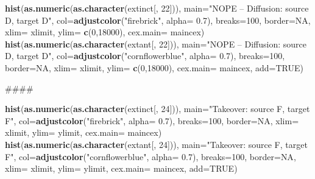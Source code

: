 \documentclass[]{book}
\newenvironment{Shaded}{\begin{snugshade}}{\end{snugshade}}
\newcommand{\KeywordTok}[1]{\textcolor[rgb]{0.13,0.29,0.53}{\textbf{{#1}}}}
\newcommand{\DataTypeTok}[1]{\textcolor[rgb]{0.13,0.29,0.53}{{#1}}}
\newcommand{\DecValTok}[1]{\textcolor[rgb]{0.00,0.00,0.81}{{#1}}}
\newcommand{\FloatTok}[1]{\textcolor[rgb]{0.00,0.00,0.81}{{#1}}}
\newcommand{\StringTok}[1]{\textcolor[rgb]{0.31,0.60,0.02}{{#1}}}
\newcommand{\OtherTok}[1]{\textcolor[rgb]{0.56,0.35,0.01}{{#1}}}
\newcommand{\NormalTok}[1]{{#1}}
\theoremstyle{definition}
\theoremstyle{definition}
\theoremstyle{remark}
\begin{document}
\begin{Shaded}
\begin{Highlighting}[]
\KeywordTok{hist}\NormalTok{(}\KeywordTok{as.numeric}\NormalTok{(}\KeywordTok{as.character}\NormalTok{(extinct[, }\DecValTok{22}\NormalTok{])), }\DataTypeTok{main=}\StringTok{"NOPE -- Diffusion: source D, target D"}\NormalTok{, }\DataTypeTok{col=}\KeywordTok{adjustcolor}\NormalTok{(}\StringTok{"firebrick"}\NormalTok{, }\DataTypeTok{alpha=} \FloatTok{0.7}\NormalTok{), }\DataTypeTok{breaks=}\DecValTok{100}\NormalTok{, }\DataTypeTok{border=}\OtherTok{NA}\NormalTok{, }\DataTypeTok{xlim=}\NormalTok{ xlimit, }\DataTypeTok{ylim=} \KeywordTok{c}\NormalTok{(}\DecValTok{0}\NormalTok{,}\DecValTok{18000}\NormalTok{), }\DataTypeTok{cex.main=}\NormalTok{ maincex)}
\KeywordTok{hist}\NormalTok{(}\KeywordTok{as.numeric}\NormalTok{(}\KeywordTok{as.character}\NormalTok{(extant[, }\DecValTok{22}\NormalTok{])), }\DataTypeTok{main=}\StringTok{"NOPE -- Diffusion: source D, target D"}\NormalTok{, }\DataTypeTok{col=}\KeywordTok{adjustcolor}\NormalTok{(}\StringTok{"cornflowerblue"}\NormalTok{, }\DataTypeTok{alpha=} \FloatTok{0.7}\NormalTok{), }\DataTypeTok{breaks=}\DecValTok{100}\NormalTok{, }\DataTypeTok{border=}\OtherTok{NA}\NormalTok{, }\DataTypeTok{xlim=}\NormalTok{ xlimit, }\DataTypeTok{ylim=} \KeywordTok{c}\NormalTok{(}\DecValTok{0}\NormalTok{,}\DecValTok{18000}\NormalTok{), }\DataTypeTok{cex.main=}\NormalTok{ maincex, }\DataTypeTok{add=}\OtherTok{TRUE}\NormalTok{)}

\NormalTok{####}

\KeywordTok{hist}\NormalTok{(}\KeywordTok{as.numeric}\NormalTok{(}\KeywordTok{as.character}\NormalTok{(extinct[, }\DecValTok{24}\NormalTok{])), }\DataTypeTok{main=}\StringTok{"Takeover: source F, target F"}\NormalTok{, }\DataTypeTok{col=}\KeywordTok{adjustcolor}\NormalTok{(}\StringTok{"firebrick"}\NormalTok{, }\DataTypeTok{alpha=} \FloatTok{0.7}\NormalTok{), }\DataTypeTok{breaks=}\DecValTok{100}\NormalTok{, }\DataTypeTok{border=}\OtherTok{NA}\NormalTok{, }\DataTypeTok{xlim=}\NormalTok{ xlimit, }\DataTypeTok{ylim=}\NormalTok{ ylimit, }\DataTypeTok{cex.main=}\NormalTok{ maincex)}
\KeywordTok{hist}\NormalTok{(}\KeywordTok{as.numeric}\NormalTok{(}\KeywordTok{as.character}\NormalTok{(extant[, }\DecValTok{24}\NormalTok{])), }\DataTypeTok{main=}\StringTok{"Takeover: source F, target F"}\NormalTok{, }\DataTypeTok{col=}\KeywordTok{adjustcolor}\NormalTok{(}\StringTok{"cornflowerblue"}\NormalTok{, }\DataTypeTok{alpha=} \FloatTok{0.7}\NormalTok{), }\DataTypeTok{breaks=}\DecValTok{100}\NormalTok{, }\DataTypeTok{border=}\OtherTok{NA}\NormalTok{, }\DataTypeTok{xlim=}\NormalTok{ xlimit, }\DataTypeTok{ylim=}\NormalTok{ ylimit, }\DataTypeTok{cex.main=}\NormalTok{ maincex, }\DataTypeTok{add=}\OtherTok{TRUE}\NormalTok{)}




\end{Highlighting}
\end{Shaded}
\end{document}
